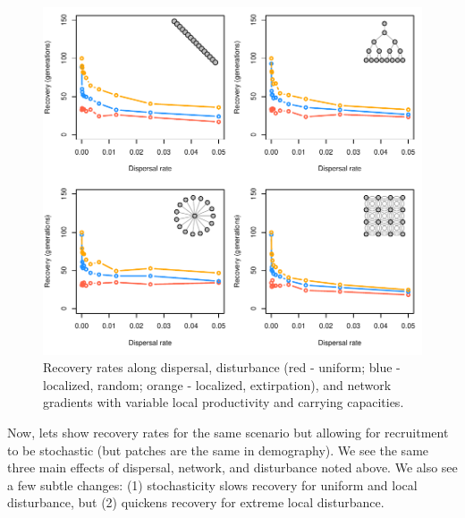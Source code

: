 \documentclass[]{article}
\begin{document}
\begin{figure}[H]

{\centering \includegraphics{Managing_for_ecological_surprises_in_metapopulations_makeHTML_files/figure-latex/results for variables patches-1} 

}

\caption{Recovery rates along dispersal, disturbance (red - uniform; blue - localized, random; orange - localized, extirpation), and network gradients with variable local productivity and carrying capacities.}\label{fig:results for variables patches}
\end{figure}
\newpage

Now, lets show recovery rates for the same scenario but allowing for
recruitment to be stochastic (but patches are the same in demography).
We see the same three main effects of dispersal, network, and
disturbance noted above. We also see a few subtle changes: (1)
stochasticity slows recovery for uniform and local disturbance, but (2)
quickens recovery for extreme local disturbance.
\end{document}
